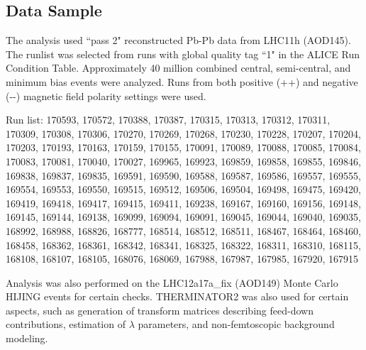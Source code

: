 \documentclass[../AnalysisNoteJBuxton.tex]{subfiles}
\begin{document}
\subsection{Data Sample}
\label{sec:DataSample}

The analysis used ``pass 2" reconstructed Pb-Pb data from LHC11h (AOD145).
The runlist was selected from runs with global quality tag ``1" in the ALICE Run Condition Table.
Approximately 40 million combined central, semi-central, and minimum bias events were analyzed.
Runs from both positive (++) and negative (-{}-) magnetic field polarity settings were used.

Run list:  	
170593, 170572, 170388, 170387, 170315, 170313, 170312, 170311, 170309, 170308, 170306, 170270, 170269, 170268, 170230, 170228, 170207, 170204, 170203, 170193, 170163, 170159, 170155, 170091, 170089, 170088, 170085, 170084, 170083, 170081, 170040, 170027, 169965, 169923, 169859, 169858, 169855, 169846, 169838, 169837, 169835, 169591, 169590, 169588, 169587, 169586, 169557, 169555, 169554, 169553, 169550, 169515, 169512, 169506, 169504, 169498, 169475, 169420, 169419, 169418, 169417, 169415, 169411, 169238, 169167, 169160, 169156, 169148, 169145, 169144, 169138, 169099, 169094, 169091, 169045, 169044, 169040, 169035, 168992, 168988, 168826, 168777, 168514, 168512, 168511, 168467, 168464, 168460, 168458, 168362, 168361, 168342, 168341, 168325, 168322, 168311, 168310, 168115, 168108, 168107, 168105, 168076, 168069, 167988, 167987, 167985, 167920, 167915

Analysis was also performed on the LHC12a17a\_fix (AOD149) Monte Carlo HIJING events for certain checks.  THERMINATOR2 was also used for certain aspects, such as generation of transform matrices describing feed-down contributions, estimation of $\lambda$ parameters, and non-femtoscopic background modeling.
\end{document}

